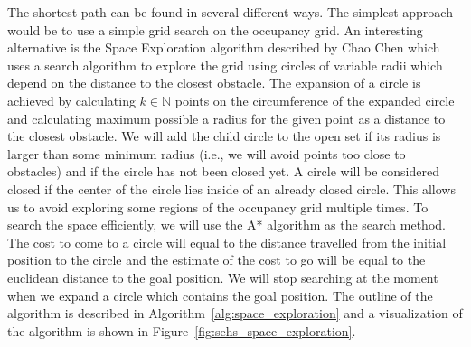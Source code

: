 The shortest path can be found in several different ways. The simplest approach would be to use a simple grid search on the occupancy grid. An interesting alternative is the Space Exploration algorithm described by Chao Chen \cite{SEHS} which uses a search algorithm to explore the grid using circles of variable radii which depend on the distance to the closest obstacle. The expansion of a circle is achieved by calculating $k\in\mathbb{N}$ points on the circumference of the expanded circle and calculating maximum possible a radius for the given point as a distance to the closest obstacle. We will add the child circle to the open set if its radius is larger than some minimum radius (i.e., we will avoid points too close to obstacles) and if the circle has not been closed yet. A circle will be considered closed if the center of the circle lies inside of an already closed circle. This allows us to avoid exploring some regions of the occupancy grid multiple times. To search the space efficiently, we will use the A* algorithm as the search method. The cost to come to a circle will equal to the distance travelled from the initial position to the circle and the estimate of the cost to go will be equal to the euclidean distance to the goal position. We will stop searching at the moment when we expand a circle which contains the goal position. The outline of the algorithm is described in Algorithm~\ref{alg:space_exploration} and a visualization of the algorithm is shown in Figure~\ref{fig:sehs_space_exploration}.

